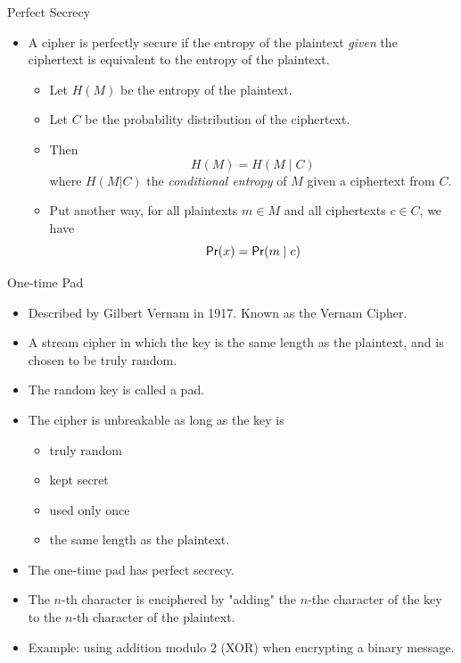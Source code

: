 \documentclass[presentation]{beamer}
\begin{document}
\begin{frame}[label=sec-7]{Perfect Secrecy}
\begin{itemize}[<+->]
\item A cipher is perfectly secure if the entropy of the plaintext \emph{given} the ciphertext is equivalent to the entropy of the plaintext.
\begin{itemize}
\item Let $H(M)$ be the entropy of the plaintext.
\item Let $C$ be the probability distribution of the ciphertext.
\item Then 
\begin{equation*}
H(M) = H(M \mid C)
\end{equation*} where $H(M | C)$ the \emph{conditional entropy} of $M$ given a ciphertext from $C$.
\item Put another way, for all plaintexts $m \in M$ and all ciphertexts $c \in C$, we have
\begin{equation*}
 \mathsf{Pr}(x) = \mathsf{Pr}(m \mid c)
\end{equation*}
\end{itemize}
\end{itemize}
\end{frame}
\begin{frame}[label=sec-8]{One-time Pad}
\begin{itemize}[<+->]
\item Described by Gilbert Vernam in 1917. Known as the Vernam Cipher.
\item A stream cipher in which the key is the same length as the plaintext, and is chosen to be truly random.
\item The random key is called a pad.
\item The cipher is unbreakable as long as the key is
\begin{itemize}
\item truly random
\item kept secret
\item used only once
\item the same length as the plaintext.
\end{itemize}
\item The one-time pad has perfect secrecy.
\item The $n$-th character is enciphered by "adding" the $n$-the character of the key to the $n$-th character of the plaintext.
\item Example: using addition modulo $2$ (XOR) when encrypting a binary message.
\end{itemize}
\end{frame}
\end{document}
